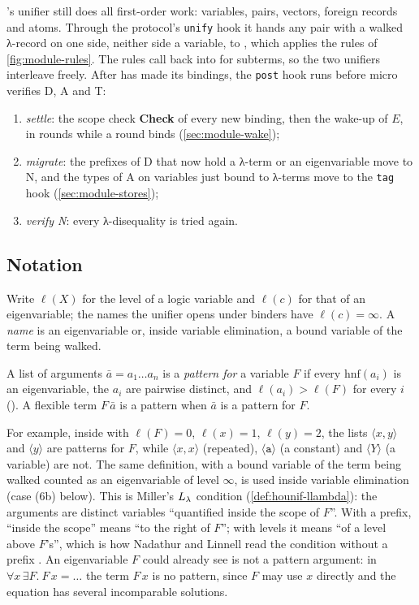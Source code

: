 \micro's unifier  still does all first-order work: variables, pairs, vectors, foreign
records and atoms. Through the protocol's \texttt{unify} hook it hands any pair with a walked λ-record on one
side, neither side a variable, to , which applies the rules of \cref{fig:module-rules}.
The rules call back into  for subterms, so the two unifiers interleave freely. After
 has made its bindings, the \texttt{post} hook  runs before micro verifies D, A
and T:
\begin{enumerate}
  \item \emph{settle}: the scope check \textbf{Check} of every new binding, then the wake-up of $E$, in rounds
    while a round binds (\cref{sec:module-wake});
  \item \emph{migrate}: the prefixes of D that now hold a λ-term or an eigenvariable move to N, and the types of
    A on variables just bound to λ-terms move to the \texttt{tag} hook (\cref{sec:module-stores});
  \item \emph{verify N}: every λ-disequality is tried again.
\end{enumerate}

\subsection{Notation}

Write $\ell(X)$ for the level of a logic variable and $\ell(c)$ for that of an eigenvariable; the names the
unifier opens under binders have $\ell(c)=\infty$. A \emph{name} is an eigenvariable or, inside variable
elimination, a bound variable of the term being walked.
\begin{definition}\label{def:module-pattern}
A list of arguments $\bar a = a_1\dots a_n$ is a \emph{pattern for} a variable $F$ if every $\mathrm{hnf}(a_i)$
is an eigenvariable, the $a_i$ are pairwise distinct, and $\ell(a_i) > \ell(F)$ for every $i$
(). A flexible term $F\,\bar a$ is a pattern when $\bar a$ is a pattern for $F$.
\end{definition}
For example, inside  with $\ell(F)=0$, $\ell(x)=1$, $\ell(y)=2$, the lists $\langle x,y\rangle$
and $\langle y\rangle$ are patterns for $F$, while $\langle x,x\rangle$ (repeated), $\langle \mathtt{a}\rangle$ (a
constant) and $\langle Y\rangle$ (a variable) are not. The same definition, with a bound variable of the
term being walked counted as an eigenvariable of level $\infty$, is used inside variable elimination (case (6b)
below).
This is Miller's $L_\lambda$ condition (\cref{def:hounif-llambda}): the arguments are distinct variables
\enquote{quantified inside the scope of $F$}. With a prefix, \enquote{inside the scope} means \enquote{to the
right of $F$}; with levels it means \enquote{of a level above $F$'s}, which is how Nadathur and Linnell read the
condition without a prefix \cite[§4]{NadathurLinnell2005}. An eigenvariable $F$ could already see is not a
pattern argument: in $\forall x\,\exists F.\ F\,x = \dots$ the term $F\,x$ is no pattern, since $F$ may use
$x$ directly and the equation has several incomparable solutions.

